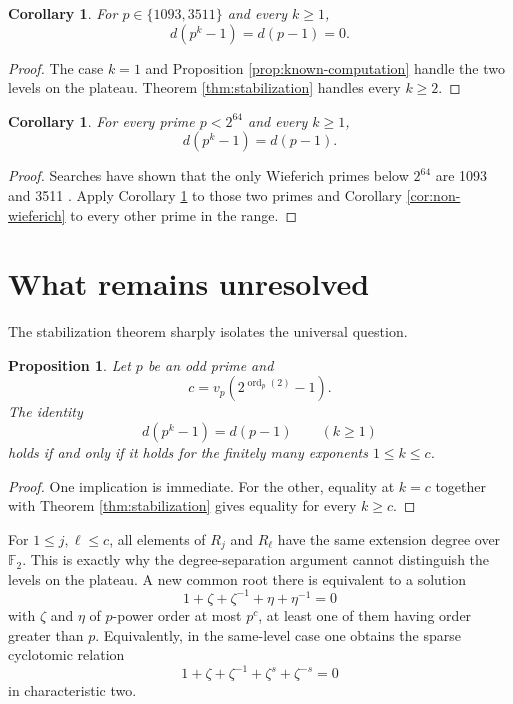 \documentclass[a4paper]{article}
\newtheorem{corollary}[theorem]{Corollary}
\newtheorem{proposition}[theorem]{Proposition}
\newcommand{\F}{\mathbb{F}}
\newcommand{\ord}[2][]{\operatorname{ord}_{#1}\!\left(#2\right)}
\begin{document}
\begin{corollary}\label{cor:known-wieferich}
	For $p\in\{1093,3511\}$ and every $k\geq1$,
	\[
		d(p^k-1)=d(p-1)=0.
	\]
\end{corollary}

\begin{proof}
	The case $k=1$ and Proposition \ref{prop:known-computation} handle the two levels on the plateau.
	Theorem \ref{thm:stabilization} handles every $k\geq2$.
\end{proof}

\begin{corollary}\label{cor:below-bound}
	For every prime $p<2^{64}$ and every $k\geq1$,
	\[
		d(p^k-1)=d(p-1).
	\]
\end{corollary}

\begin{proof}
	Searches have shown that the only Wieferich primes below $2^{64}$ are 1093 and 3511 \cite{PrimeGridWieferich}.
	Apply Corollary \ref{cor:known-wieferich} to those two primes and Corollary \ref{cor:non-wieferich} to every other prime in the range.
\end{proof}

\section{What remains unresolved}

The stabilization theorem sharply isolates the universal question.

\begin{proposition}\label{prop:finite-obstruction}
	Let $p$ be an odd prime and
	\[
		c=v_p\!\left(2^{\ord[p]{2}}-1\right).
	\]
	The identity
	\[
		d(p^k-1)=d(p-1)\qquad(k\geq1)
	\]
	holds if and only if it holds for the finitely many exponents $1\leq k\leq c$.
\end{proposition}

\begin{proof}
	One implication is immediate.
	For the other, equality at $k=c$ together with Theorem \ref{thm:stabilization} gives equality for every $k\geq c$.
\end{proof}

For $1\leq j,\ell\leq c$, all elements of $R_j$ and $R_\ell$ have the same extension degree over $\F_2$.
This is exactly why the degree-separation argument cannot distinguish the levels on the plateau.
A new common root there is equivalent to a solution
\[
	1+\zeta+\zeta^{-1}+\eta+\eta^{-1}=0
\]
with $\zeta$ and $\eta$ of $p$-power order at most $p^c$, at least one of them having order greater than $p$.
Equivalently, in the same-level case one obtains the sparse cyclotomic relation
\[
	1+\zeta+\zeta^{-1}+\zeta^s+\zeta^{-s}=0
\]
in characteristic two.
\end{document}
